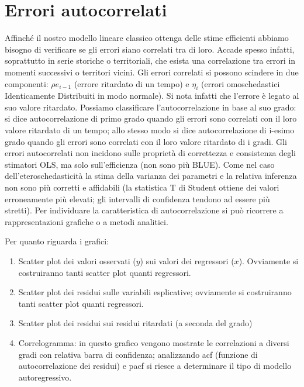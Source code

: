 \documentclass[a4page, 11pt]{article}
\begin{document}
\section{Errori autocorrelati}

Affinché il nostro modello lineare classico ottenga delle stime efficienti abbiamo bisogno di verificare se gli errori siano correlati tra di loro.
Accade spesso infatti, soprattutto in serie storiche o territoriali, che esista una correlazione tra errori in momenti successivi o territori vicini.
Gli errori correlati si possono scindere in due componenti: $\rho e_{ i-1}$ (errore ritardato di un tempo) e $\eta_i$ (errori omoschedastici Identicamente Distribuiti in modo normale). %
Si nota infatti che l’errore è legato al suo valore ritardato.
Possiamo classificare l’autocorrelazione in base al suo grado: si dice autocorrelazione di primo grado quando gli errori sono correlati con il loro valore ritardato di un tempo; allo stesso modo si dice autocorrelazione di i-esimo grado quando gli errori sono correlati con il loro valore ritardato di i gradi. Gli errori autocorrelati non incidono sulle proprietà di correttezza e consistenza degli stimatori OLS, ma solo sull’efficienza (non sono più BLUE). Come nel caso dell’eteroschedasticità la stima della varianza dei parametri e la relativa inferenza non sono più corretti e affidabili (la statistica T di Student ottiene dei valori erroneamente più elevati; gli intervalli di confidenza tendono ad essere più stretti).
Per individuare la caratteristica di autocorrelazione si può ricorrere a rappresentazioni grafiche o a metodi analitici.

Per quanto riguarda i grafici:
\begin{enumerate}[noitemsep]
\item Scatter plot dei valori osservati ($y$) sui valori dei regressori ($x$). Ovviamente si costruiranno tanti scatter plot quanti regressori.
\item Scatter plot dei residui sulle variabili esplicative; ovviamente si costruiranno tanti scatter plot quanti regressori.
\item Scatter plot dei residui sui residui ritardati (a seconda del grado)
\item Correlogramma: in questo grafico vengono mostrate le correlazioni a diversi gradi con relativa barra di confidenza; analizzando acf (funzione di autocorrelazione dei residui) e pacf si riesce a determinare il tipo di modello autoregressivo.
\end{enumerate}
\end{document}
